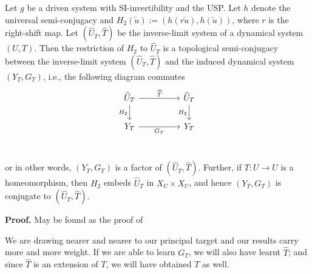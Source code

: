 \begin{Theorem}
\label{Thm_CET}
	Let $g$ be a driven system with SI-invertibility and the USP. Let $h$ denote the universal semi-conjugacy and $H_2(\overleftarrow{u}) := (h(r\overleftarrow{u}),h(\overleftarrow{u}))$, where $r$ is the right-shift map. 
 Let $(\widehat{U}_T, \widehat{T})$  be the inverse-limit system of a dynamical system $(U,T)$. 
 Then the restriction of $H_2$ to $\widehat{U}_T$ is a topological semi-conjugacy between the inverse-limit system $(\widehat{U}_T, \widehat{T})$ 
and the induced dynamical system  $(Y_T,G_T)$, i.e., the following diagram commutes
\begin{equation} \label{comm_H_CET}
	\begin{tikzcd}
	{\widehat{U}_T} && {\widehat{U}_T} \\
		{Y_T} && {Y_T} \\
	\arrow["{\widehat{T}}", from=1-1, to=1-3]
			\arrow["{H_2}"', from=1-3, to=2-3]
			\arrow["H_2"', from=1-1, to=2-1]
		\arrow["G_T"', from=2-1, to=2-3]
	\end{tikzcd}
	\end{equation}
or in other words, $(Y_T, G_T)$ is a factor of  $(\widehat{U}_T, \widehat{T})$. Further, if $T:U \to U$ is a homeomorphism, 
then $H_2$ embeds $\widehat{U}_T$ in $X_U \times X_U$, and hence $(Y_T, G_T)$ is conjugate to $(\widehat{U}_T, \widehat{T})$.
\end{Theorem}
\vspace{-6mm}
{\bf Proof.}  May be found as the proof of~\cite[Theorem.4]{Supp}

We are drawing nearer and nearer to our principal target and our results carry more and more weight. If we are able to learn $G_T$, we will also have learnt $\widehat{T}$; and since $\widehat{T}$ is an extension of $T$, we will have obtained $T$ as well.  %



 

